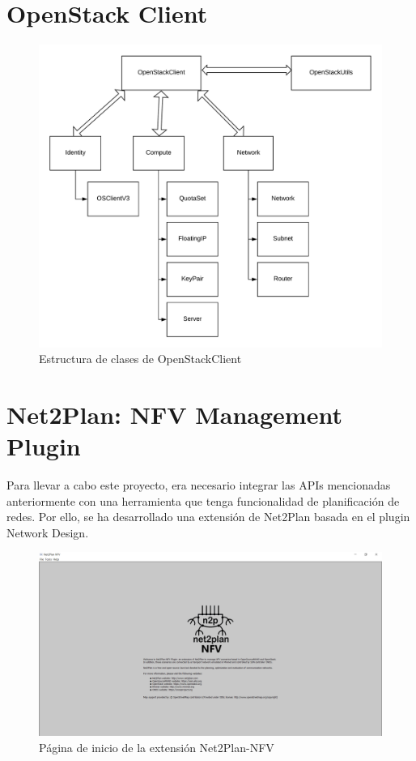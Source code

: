 \section{OpenStack Client}
\label{sec:openstackclient}

\begin{figure}[!ht]
	\centering
	\includegraphics[width=0.7\linewidth]{imagenes/OpenStackClient}
	\caption{Estructura de clases de OpenStackClient}
	\label{fig:openstackclient}
\end{figure}

\section{Net2Plan: NFV Management Plugin}
\label{sec:nfvplugin}

Para llevar a cabo este proyecto, era necesario integrar las APIs mencionadas anteriormente con una herramienta que tenga funcionalidad de planificación de redes. Por ello, se ha desarrollado una extensión de Net2Plan basada en el plugin Network Design.

\begin{figure}[!ht]
	\centering
	\includegraphics[width=0.8\linewidth]{imagenes/nfvpluginmain}
	\caption{Página de inicio de la extensión Net2Plan-NFV}
	\label{fig:nfvpluginmain}
\end{figure}


